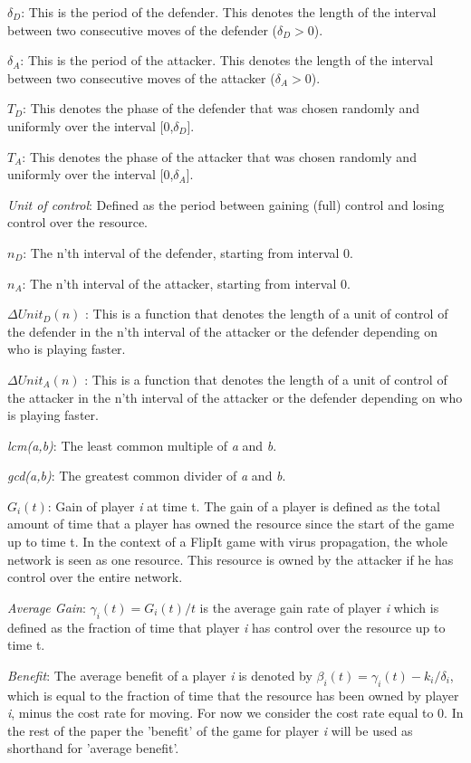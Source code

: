 \begin{description}
\item $\delta_{D}$: This is the period of the defender. This denotes the length of the interval between two consecutive moves of the defender ($\delta_{D} > 0$).
\item $\delta_{A}$: This is the period of the attacker. This denotes the length of the interval between two consecutive moves of the attacker ($\delta_{A} > 0$).
\item \textit{$T_{D}$}: This denotes the phase of the defender that was chosen randomly and uniformly over the interval [0,$\delta_{D}$].
\item \textit{$T_{A}$}: This denotes the phase of the attacker that was chosen randomly and uniformly over the interval [0,$\delta_{A}$].
\item \textit{Unit of control}: Defined as the period between gaining (full) control and losing control over the resource.  
\item $n_{D}$: The n'th interval of the defender, starting from interval 0.
\item $n_{A}$: The n'th interval of the attacker, starting from interval 0.
\item $\Delta Unit_{D}(n)$ : This is a function that denotes the length of a unit of control of the defender in the n'th interval of the attacker or the defender depending on who is playing faster.
\item $\Delta Unit_{A}(n)$ : This is a function that denotes the length of a unit of control of the attacker in the n'th interval of the attacker or the defender depending on who is playing faster.
\item \textit{lcm(a,b)}: The least common multiple of \textit{a} and \textit{b}.
\item \textit{gcd(a,b)}: The greatest common divider of \textit{a} and \textit{b}.
\item $G_{i}(t)$: Gain of player \textit{i} at time t. The gain of a player is defined as the total amount of time that a player has owned the resource since the start of the game up to time t. In the context of a FlipIt game with virus propagation, the whole network is seen as one resource. This resource is owned by the attacker if he has control over the entire network.\\
\item \textit{Average Gain}:  $\gamma_{i}(t) = G_{i}(t)/t$ is the average gain rate of player \textit{i} which is defined as the fraction of time that player \textit{i} has control over the resource up to time t.
\item \textit{Benefit}: The average benefit of a player \textit{i} is denoted by $\beta_{i}(t) = \gamma_{i}(t) - k_{i} / \delta_{i}$, which is equal to the fraction of time that the resource has been owned by player \textit{i}, minus the cost rate for moving. For now we consider the cost rate equal to 0.
In the rest of the paper the 'benefit' of the game for player \textit{i} will be used as shorthand for 'average benefit'.

\end{description}
